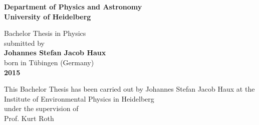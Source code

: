 \begin{titlepage}
\begin{center}
 
\Large\textbf{Department of Physics and Astronomy\\
University of Heidelberg}

\vspace{16cm}

\normalsize
Bachelor Thesis in Physics\\
submitted by \\
\vspace{0.5cm}
\Large\textbf{Johannes Stefan Jacob Haux}\\
\normalsize
\vspace{0.5cm}
born in Tübingen (Germany)\\
\vspace{0.5cm}
\Large\textbf{2015}
\normalsize

\newpage




\vspace{18cm}

\normalsize
This Bachelor Thesis has been carried out by Johannes Stefan Jacob Haux at the\\
Institute of Environmental Physics in Heidelberg\\
under the supervision of\\
Prof. Kurt Roth

\vfill
\end{center}

\end{titlepage}
